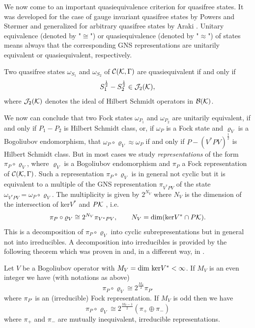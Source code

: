 \documentclass[10pt,a4paper]{article}
\begin{document}
We now come to an important quasiequivalence
criterion for quasifree states. It was developed for
the case of gauge invariant quasifree states by Powers
and St{\o}rmer \cite{Pow} and generalized for arbitrary
quasifree states by Araki \cite{Ara1}. Unitary equivalence
(denoted by "$\cong$") or quasiequivalence
(denoted by "$\approx$") of states means always that
the corresponding GNS representations are unitarily
equivalent or quasiequivalent, respectively.
\begin{theorem}
\label{Araki}
Two quasifree states $\omega_{S_1}$ and
$\omega_{S_2}$ of ${\cal C}({\cal K},\Gamma)$
are quasiequivalent if and only if
\begin{equation}
S_1^\frac{1}{2} - S_2^\frac{1}{2} \in {\cal J}_2 ({\cal K}),
\end{equation}
where ${\cal J}_2({\cal K})$ denotes the ideal of
Hilbert Schmidt operators in ${\cal B}({\cal K})$.
\end{theorem}
We now can conclude that two Fock states
$\omega_{P_1}$ and $\omega_{P_2}$ are unitarily equivalent,
if and only if $P_1-P_2$ is Hilbert Schmidt class, or,
if $\omega_P$ is a Fock state and $\varrho_V$
is a Bogoliubov endomorphism, that
$\omega_P\circ\varrho_V\approx\omega_P$ if and only if
$P-(V^*PV)^\frac{1}{2}$
is Hilbert Schmidt class. But in most cases we study
{\sl representations} of the form $\pi_P\circ\varrho_V$,
where $\varrho_V$ is a Bogoliubov endomorphism and
$\pi_P$ a Fock representation of ${\cal C}({\cal K},\Gamma)$.
Such a representation $\pi_P\circ\varrho_V$ is in general
not cyclic but it is equivalent to a multiple of the
GNS representation $\pi_{V^*PV}$ of the state
$\omega_{V^*PV}=\omega_P\circ\varrho_V$. The
multiplicity is given by $2^{N_V}$ where $N_V$
is the dimension of the intersection of
ker$V^*$ and $P{\cal K}$ \cite{Binnenneu,Rideau},
i.e.
\begin{equation}
\label{cyclics}
\pi_P\circ\varrho_V\cong 2^{N_V}\pi_{V^*PV},
\qquad N_V={\rm dim}({\rm ker}V^*\cap P{\cal K}).
\end{equation}
This is a decomposition of $\pi_P\circ\varrho_V$
into cyclic subrepresentations but in general
not into irreducibles. A decomposition into
irreducibles is provided by the following theorem
which was proven in \cite{Decom} and, in a
different way, in \cite{Binnenneu}.
\begin{theorem}
\label{evenodd}
Let $V$ be a Bogoliubov operator with
$M_V=\mbox{\rm dim ker}V^* < \infty$. If $M_V$ is
an even integer we have (with notations as above)
\begin{equation}
\pi_P\circ\varrho_V \cong 2^\frac{M_V}{2} \pi_{P'}
\end{equation}
where $\pi_{P'}$ is an (irreducible) Fock representation.
If $M_V$ is odd then we have
\begin{equation}
\label{decomodd}
\pi_P\circ\varrho_V \cong 2^\frac{M_V-1}{2}
(\pi_+ \oplus \pi_-)
\end{equation}
where $\pi_+$ and $\pi_-$ are mutually inequivalent,
irreducible representations.
\end{theorem}
\end{document}
